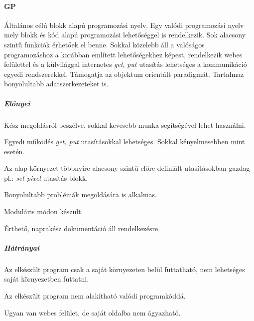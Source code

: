\documentclass[12pt,a4paper,oneside]{report} %
\begin{document}
\paragraph{GP} Általános célú blokk alapú \cite{ohshima2015module} \cite{monig2015blocks} programozási nyelv. Egy valódi programozási nyelv mely blokk és kód alapú programozási lehetőséggel is rendelkezik.  Sok alacsony szintű funkciók érhetőek el benne. Sokkal közelebb áll a valóságos programozáshoz a korábban említett lehetőségekhez képest, rendelkezik webes felülettel és a külvilággal internetes \textit{get}, \textit{put} utasítás lehetséges a kommunikáció egyedi rendszerekkel. Támogatja az objektum orientált paradigmát. Tartalmaz bonyolultabb adatszerkezeteket is.
\subparagraph{Előnyei} 
\begin{compactitem}
	\item Kész megoldásról beszélve, sokkal kevesebb munka segítségével lehet használni.
	\item Egyedi működés \textit{get, put} utasításokkal lehetséges. \newline Sokkal kényelmesebben mint  esetén.
	\item Az alap környezet többnyire alacsony szintű előre definiált utasításokban gazdag pl.: \textit{set pixel} utasítás blokk.
	\item Bonyolultabb problémák megoldására is alkalmas.
	\item Moduláris módon készült.
	\item Érthető, naprakész dokumentáció áll rendelkezésre.
\end{compactitem}
\subparagraph{Hátrányai} 
\begin{compactitem}
	\item Az elkészült program csak a saját környezeten belül futtatható, nem lehetséges saját környezetben futtatni.
	\item Az elkészült program nem alakítható valódi programkóddá.
	\item Ugyan van webes felület, de saját oldalba nem ágyazható.
\end{compactitem}
\end{document}
